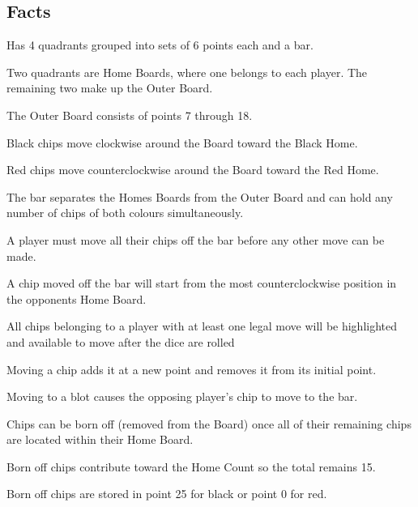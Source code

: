 \documentclass{report}
\begin{document}
    \subsection{Facts}

    \begin{dashed}
        \item Has 4 quadrants grouped into sets of 6 points each and a bar.
        \item Two quadrants are Home Boards, where one belongs to each player. The remaining two make up the Outer Board.
        \item The Outer Board consists of points 7 through 18.
        \item Black chips move clockwise around the Board toward the Black Home.
        \item Red chips move counterclockwise around the Board toward the Red Home.
        \item The bar separates the Homes Boards from the Outer Board and can hold any number of chips of both colours simultaneously.
        \item A player must move all their chips off the bar before any other move can be made.
        \item A chip moved off the bar will start from the most counterclockwise position in the opponents Home Board.
        \item All chips belonging to a player with at least one legal move will be highlighted and available to move after the dice are rolled
        \item Moving a chip adds it at a new point and removes it from its initial point.
        \item Moving to a blot causes the opposing player’s chip to move to the bar.
        \item Chips can be born off (removed from the Board) once all of their remaining chips are located within their Home Board.
        \item Born off chips contribute toward the Home Count so the total remains 15.
        \item Born off chips are stored in point 25 for black or point 0 for red.
    \end{dashed}

\end{document}
